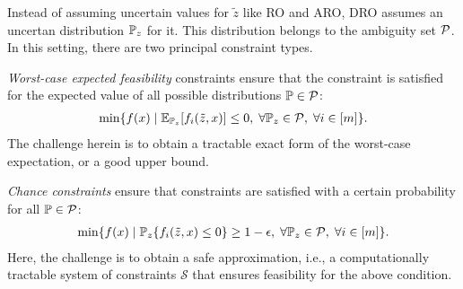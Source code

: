 Instead of assuming uncertain values for $\tilde{z}$ like RO and ARO, DRO assumes an uncertan distribution $\mathbb{P}_z$ for it. This distribution belongs to the ambiguity set $\mathcal{P}$. In this setting, there are two principal constraint types.

\textit{Worst-case expected feasibility} constraints ensure that the constraint is satisfied for the expected value of all possible distributions $\mathbb{P}\in\mathcal{P}$:
\begin{align*}
	\min \{f(x) \mid \mathbb{E}_{\mathbb{P}_z} [f_i(\tilde{z},x)]\leq0,\;\forall \mathbb{P}_z\in\mathcal{P},\;\forall i\in[m]\}.
\end{align*}
The challenge herein is to obtain a tractable exact form of the worst-case expectation, or a good upper bound.

\textit{Chance constraints} ensure that constraints are satisfied with a certain probability for all $\mathbb{P}\in\mathcal{P}$:
\begin{align*}
	\min \{f(x) \mid \mathbb{P}_z\{f_i(\tilde{z},x)\leq0\}\geq 1-\epsilon,\;\forall \mathbb{P}_z\in\mathcal{P},\;\forall i\in[m]\}.
\end{align*}
Here, the challenge is to obtain a safe approximation, i.e., a computationally tractable system of constraints $\mathcal{S}$ that ensures feasibility for the above condition.

